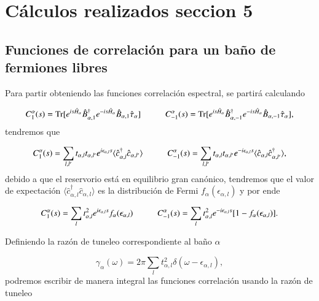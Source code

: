 \begin{appendixs}
    \label{apendix4:secondlaw}


\newpage

\section{Cálculos realizados seccion 5}
\subsection{Funciones de correlación para un baño de fermiones libres}
Para partir obteniendo las funciones correlación espectral, se partirá calculando

\begin{equation*}
    C_{1}^{\alpha}(s) = \text{Tr}[e^{is\hat{H}_{\alpha}}\hat{B}^{\dagger}_{\alpha,1}e^{-is\hat{H}_{\alpha}}\hat{B}_{\alpha,1}\hat{\tau}_{\alpha}  ]  \hspace{10mm} C_{-1}^{\alpha}(s) = \text{Tr}[e^{is\hat{H}_{\alpha}}\hat{B}^{\dagger}_{\alpha,-1}e^{-is\hat{H}_{\alpha}}\hat{B}_{\alpha,-1}\hat{\tau}_{\alpha}  ], 
\end{equation*}
tendremos que

\begin{equation*}
    C_{1}^{\alpha}(s) = \sum_{l,l'}t_{\alpha,l}t_{\alpha,l'}e^{i\epsilon_{\alpha,l}s} \langle \hat{c}^{\dagger}_{\alpha,l}\hat{c}_{\alpha,l'} \rangle \hspace{10mm} C
    ^{\alpha}_{-1}(s) = \sum_{l,l'}t_{\alpha,l}t_{\alpha,l'}e^{-i\epsilon_{\alpha,l}s} \langle \hat{c}_{\alpha,l}\hat{c}^{\dagger}_{\alpha,l'} \rangle,
\end{equation*}
debido a que el reservorio está en equilibrio gran canónico, tendremos que el valor de expectación $\langle \hat{c}^{\dagger}_{\alpha,l}\hat{c}_{\alpha,l}\rangle$ es la distribución de Fermi $f_{\alpha}(\epsilon_{\alpha,l})$ y por ende  

\begin{equation*}
    C_{1}^{\alpha}(s) = \sum_{l}t^{2}_{\alpha,l}e^{i\epsilon_{\alpha,l}s} f_{\alpha}(\epsilon_{\alpha,l}) \hspace{10mm} C
    ^{\alpha}_{-1}(s) = \sum_{l}t^{2}_{\alpha,l}e^{-i\epsilon_{\alpha,l}s} [1-f_{\alpha}(\epsilon_{\alpha,l})].
\end{equation*}

Definiendo la razón de tuneleo correspondiente al baño $\alpha$

\begin{equation*}
    \gamma_{\alpha}(\omega) = 2\pi \sum_{l}t^{2}_{\alpha,l}\delta(\omega-\epsilon_{\alpha,l}),
\end{equation*}
podremos escribir de manera integral las funciones correlación usando la razón de tuneleo


\end{appendixs}
